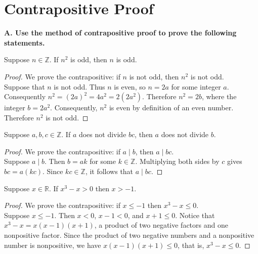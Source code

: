 \documentclass[DIN, pagenumber=false, fontsize=11pt, parskip=half]{scrartcl}
\title{}
\author{} %
\date{}
\begin{document}
\maketitle

\setcounter{section}{4}

\section{Contrapositive Proof}

\textbf{A. Use the method of contrapositive proof to prove the following statements.}

\begin{problems}
    \problem Suppose $n \in \mathbb{Z}$. If $n^2$ is odd, then $n$ is odd.
    \begin{proof}
        We prove the contrapositive: if $n$ is not odd, then $n^2$ is not odd.\\
        Suppose that $n$ is not odd.
        Thus $n$ is even, so $n = 2a$ for some integer $a$.
        Consequently $n^2 = (2a)^2 = 4a^2 = 2(2a^2).$
        Therefore $n^2 = 2b$, where the integer $b = 2a^2$.
        Consequently, $n^2$ is even by definition of an even number.
        Therefore $n^2$ is not odd.
    \end{proof}

    \problem Suppose $a,b,c \in \mathbb{Z}$. If $a$ does not divide $bc$, then $a$ does not divide $b$.
    \begin{proof}
        We prove the contrapositive: if $a \mid b$, then $a \mid bc$.\\
        Suppose $a \mid b$.
        Then $b = ak$ for some $k \in \mathbb{Z}$.
        Multiplying both sides by $c$ gives $bc = a(kc)$.
        Since $kc \in \mathbb{Z}$, it follows that $a \mid bc$.
    \end{proof}

    \problem Suppose $x \in \mathbb{R}$. If $x^3-x > 0$ then $x > -1$.
    \begin{proof}
        We prove the contrapositive: if $x \leq -1$ then $x^3-x \leq 0$.\\
        Suppose $x \leq -1$. Then $x < 0$, $x - 1 < 0$, and $x + 1 \leq 0$.
        Notice that $x^3 - x = x(x-1)(x+1)$, a product of two negative factors and one nonpositive factor.
        Since the product of two negative numbers and a nonpositive number is nonpositive, we have $x(x-1)(x+1) \leq 0$, that is, $x^3 - x \leq 0$.
    \end{proof}


\end{problems}
\end{document}
